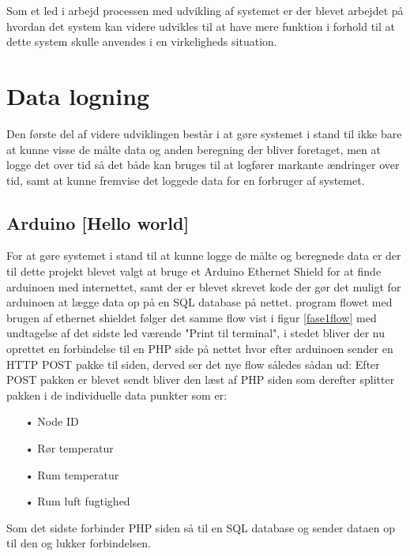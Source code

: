 Som et led i arbejd processen med udvikling af systemet er der blevet arbejdet på hvordan det system kan videre udvikles til at have mere funktion i forhold til at dette system skulle anvendes i en virkeligheds situation.

\section{Data logning}
Den første del af videre udviklingen består i at gøre systemet i stand til ikke bare at kunne visse de målte data og anden beregning der bliver foretaget, men at logge det over tid så det både kan bruges til at logfører markante ændringer over tid, samt at kunne fremvise det loggede data for en forbruger af systemet.

\subsection{Arduino [Hello world]}
For at gøre systemet i stand til at kunne logge de målte og beregnede data er der til dette projekt blevet valgt at bruge et Arduino Ethernet Shield for at finde arduinoen med internettet, samt der er blevet skrevet kode der gør det muligt for arduinoen at lægge data op på en SQL database på nettet.
\newline
program flowet med brugen af ethernet shieldet følger det samme flow vist i figur \ref{fase1flow}
med undtagelse af det sidste led værende "Print til terminal", i stedet bliver der nu oprettet en forbindelse til en PHP side på nettet hvor efter arduinoen sender en HTTP POST pakke til siden, derved ser det nye flow således sådan ud:
\newline
Efter POST pakken er blevet sendt bliver den læst af PHP siden som derefter splitter pakken i de individuelle data punkter som er:
\begin{enumerate}
	\item[•]Node ID
	\item[•]Rør temperatur
	\item[•]Rum temperatur
	\item[•]Rum luft fugtighed
\end{enumerate}
Som det sidste forbinder PHP siden så til en SQL database og sender dataen op til den og lukker forbindelsen.
